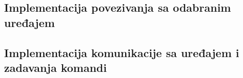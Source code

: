 \documentclass[implementacija.tex]{subfiles}
\begin{document}
\subsection{Implementacija povezivanja sa odabranim uređajem}


\subsection{Implementacija komunikacije sa uređajem i zadavanja komandi}








\end{document}
